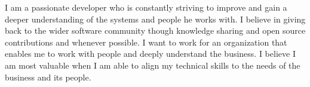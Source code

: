 %
%
%
\par{
I am a passionate developer who is constantly striving to improve and gain a deeper understanding of the
systems and people he works with. I believe in giving back to the wider software community though knowledge sharing and open source contributions and whenever possible. I want to work for an organization that enables me to work with people and deeply understand the business. I believe I am most valuable when I am able to align my technical skills to the needs of the business and its people.
}